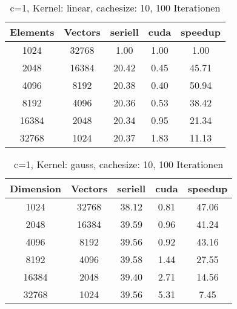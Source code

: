 \documentclass{scrartcl}
\begin{document}
\begin{table}
\begin{center}
\begin{tabular}{|c|c|c|c|c|}
\hline
Elements & Vectors & seriell & cuda & speedup \\
\hline
1024 & 32768 & 1.00 & 1.00 & 1.00 \\
2048 & 16384 & 20.42 & 0.45 & 45.71 \\
4096 & 8192 & 20.38 & 0.40 & 50.94 \\
8192 & 4096 & 20.36 & 0.53 & 38.42 \\
16384 & 2048 & 20.34 & 0.95 & 21.34 \\
32768 & 1024 & 20.37 & 1.83 & 11.13 \\
\hline
\end{tabular}
\end{center}
\caption{ c=1, Kernel: linear, cachesize: 10, 100 Iterationen}
\end{table}
\begin{table}
\begin{center}
\begin{tabular}{|c|c|c|c|c|}
\hline
Dimension & Vectors & seriell & cuda & speedup \\
\hline
1024 & 32768 & 38.12 & 0.81 & 47.06 \\
2048 & 16384 & 39.59 & 0.96 & 41.24 \\
4096 & 8192 & 39.56 & 0.92 & 43.16 \\
8192 & 4096 & 39.58 & 1.44 & 27.55 \\
16384 & 2048 & 39.40 & 2.71 & 14.56 \\
32768 & 1024 & 39.56 & 5.31 & 7.45 \\
\hline
\end{tabular}
\end{center}
\caption{ c=1, Kernel: gauss, cachesize: 10, 100 Iterationen}
\end{table}


\clearpage

\nocite{parallelreduction}
\nocite{interblockgpusync}
\nocite{introductiontosvm}
\nocite{diplomarbeit}
\nocite{libsvm}
\nocite{cudaprogrammingguide}


{}

\end{document}
